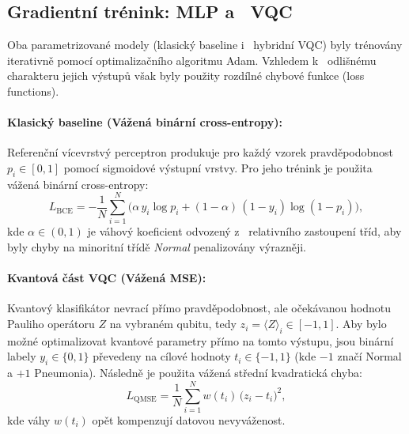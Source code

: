 \documentclass[12pt, a4paper]{report}
\begin{document}
\subsection{Gradientní trénink: MLP a ~VQC}
Oba parametrizované modely (klasický baseline i ~hybridní VQC) byly trénovány iterativně pomocí optimalizačního algoritmu Adam. Vzhledem k ~odlišnému charakteru jejich výstupů však byly použity rozdílné chybové funkce (loss functions).

\paragraph{Klasický baseline (Vážená binární cross-entropy):}
Referenční vícevrstvý perceptron produkuje pro každý vzorek pravděpodobnost $p_i \in [0,1]$ pomocí sigmoidové výstupní vrstvy. Pro jeho trénink je použita vážená binární cross-entropy:
\begin{equation}
    L_{\mathrm{BCE}} = - \frac{1}{N} \sum_{i=1}^{N} \bigl( \alpha\, y_i \log p_i + (1-\alpha)\,(1-y_i)\log(1-p_i) \bigr),
\end{equation}
kde $\alpha \in (0,1)$ je váhový koeficient odvozený z ~relativního zastoupení tříd, aby byly chyby na minoritní třídě \textit{Normal} penalizovány výrazněji.

\paragraph{Kvantová část VQC (Vážená MSE):}
Kvantový klasifikátor nevrací přímo pravděpodobnost, ale očekávanou hodnotu Pauliho operátoru $Z$ na vybraném qubitu, tedy $z_i = \langle Z \rangle_i \in [-1,1]$. Aby bylo možné optimalizovat kvantové parametry přímo na tomto výstupu, jsou binární labely $y_i \in \{0,1\}$ převedeny na cílové hodnoty $t_i \in \{-1, 1\}$ (kde $-1$ značí Normal a $+1$ Pneumonia). Následně je použita vážená střední kvadratická chyba:
\begin{equation}
    L_{\mathrm{QMSE}} = \frac{1}{N} \sum_{i=1}^{N} w(t_i)\,\bigl(z_i - t_i\bigr)^2,
\end{equation}
kde váhy $w(t_i)$ opět kompenzují datovou nevyváženost.
\end{document}
